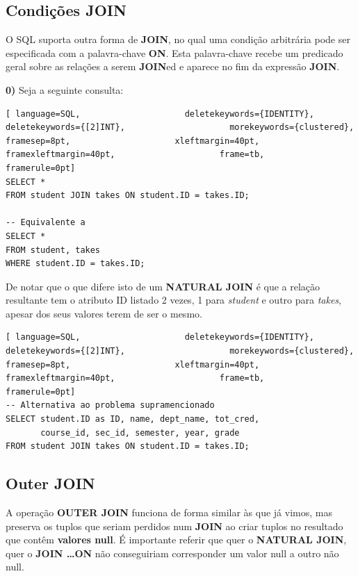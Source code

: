 \documentclass[titlepage]{book}
\theoremstyle{definition}
\begin{document}
\subsection{Condições JOIN}
O SQL suporta outra forma de \textbf{JOIN}, no qual uma condição arbitrária pode ser especificada com a palavra-chave \textbf{ON}. Esta palavra-chave recebe um predicado geral sobre as relações a serem \textbf{JOIN}ed e aparece no fim da expressão \textbf{JOIN}.

\textbf{0)} Seja a seguinte consulta:
\begin{lstlisting}[ language=SQL,                     deletekeywords={IDENTITY},                     deletekeywords={[2]INT},                     morekeywords={clustered},                     framesep=8pt,                     xleftmargin=40pt,                     framexleftmargin=40pt,                     frame=tb,                     framerule=0pt]
SELECT *
FROM student JOIN takes ON student.ID = takes.ID;

-- Equivalente a
SELECT *
FROM student, takes
WHERE student.ID = takes.ID;
\end{lstlisting}

De notar que o que difere isto de um \textbf{NATURAL JOIN} é que a relação resultante tem o atributo ID listado 2 vezes, 1 para \textit{student} e outro para \textit{takes}, apesar dos seus valores terem de ser o mesmo.
\begin{lstlisting}[ language=SQL,                     deletekeywords={IDENTITY},                     deletekeywords={[2]INT},                     morekeywords={clustered},                     framesep=8pt,                     xleftmargin=40pt,                     framexleftmargin=40pt,                     frame=tb,                     framerule=0pt]
-- Alternativa ao problema supramencionado
SELECT student.ID as ID, name, dept_name, tot_cred, 
       course_id, sec_id, semester, year, grade
FROM student JOIN takes ON student.ID = takes.ID;
\end{lstlisting}

\subsection{Outer JOIN}
A operação \textbf{OUTER JOIN} funciona de forma similar às que já vimos, mas preserva os tuplos que seriam perdidos num \textbf{JOIN} ao criar tuplos no resultado que contêm \textbf{valores null}. É importante referir que quer o \textbf{NATURAL JOIN}, quer o \textbf{JOIN \dots ON} não conseguiriam corresponder um valor null a outro não null.
\end{document}
